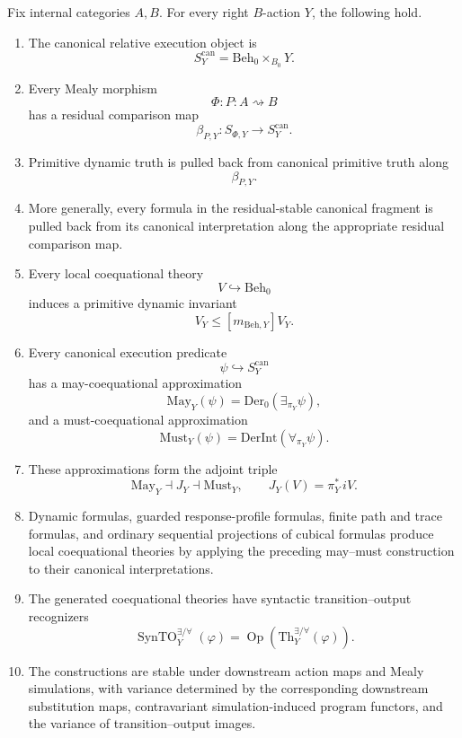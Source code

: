 \begin{theorem}
\label{thm:logical-synthesis}
Fix internal categories \(A,B\).  For every right \(B\)-action \(Y\), the
following hold.

\begin{enumerate}
  \item The canonical relative execution object is
  \[
    S^{\mathrm{can}}_Y
    =
    \mathrm{Beh}_0\times_{B_0}Y.
  \]

  \item Every Mealy morphism
  \[
    \Phi:P:A\rightsquigarrow B
  \]
  has a residual comparison map
  \[
    \beta_{P,Y}:S_{\Phi,Y}\to S^{\mathrm{can}}_Y.
  \]

  \item Primitive dynamic truth is pulled back from canonical primitive truth
  along
  \[
    \beta_{P,Y}.
  \]

  \item More generally, every formula in the residual-stable canonical
  fragment is pulled back from its canonical interpretation along the
  appropriate residual comparison map.

  \item Every local coequational theory
  \[
    V\hookrightarrow\mathrm{Beh}_0
  \]
  induces a primitive dynamic invariant
  \[
    V_Y\leq [m_{\mathrm{Beh},Y}]V_Y.
  \]

  \item Every canonical execution predicate
  \[
    \psi\hookrightarrow S^{\mathrm{can}}_Y
  \]
  has a may-coequational approximation
  \[
    \mathrm{May}_Y(\psi)
    =
    \mathrm{Der}_0(\exists_{\pi_Y}\psi),
  \]
  and a must-coequational approximation
  \[
    \mathrm{Must}_Y(\psi)
    =
    \mathrm{DerInt}(\forall_{\pi_Y}\psi).
  \]

  \item These approximations form the adjoint triple
  \[
    \mathrm{May}_Y
    \dashv
    J_Y
    \dashv
    \mathrm{Must}_Y,
    \qquad
    J_Y(V)=\pi_Y^*\,iV.
  \]

  \item Dynamic formulas, guarded response-profile formulas, finite path and
  trace formulas, and ordinary sequential projections of cubical formulas
  produce local coequational theories by applying the preceding may--must
  construction to their canonical interpretations.

  \item The generated coequational theories have syntactic
  transition--output recognizers
  \[
    \operatorname{SynTO}^{\exists/\forall}_Y(\varphi)
    =
    \operatorname{Op}
    \left(
      \mathrm{Th}^{\exists/\forall}_Y(\varphi)
    \right).
  \]

  \item The constructions are stable under downstream action maps and Mealy
  simulations, with variance determined by the corresponding downstream
  substitution maps, contravariant simulation-induced program functors, and
  the variance of transition--output images.
\end{enumerate}
\end{theorem}

